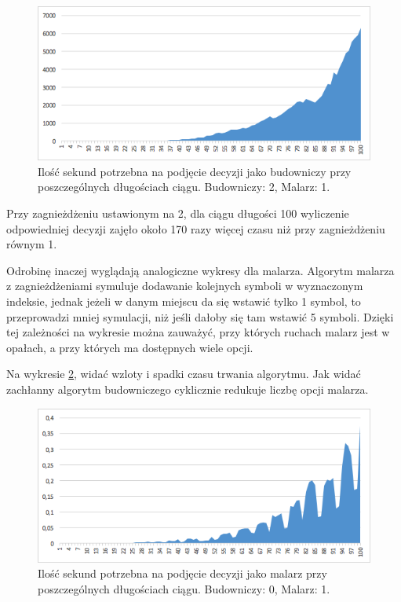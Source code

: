 \documentclass[document]{xmgr}
\begin{document}
\begin{figure}[H]
    \centering
    \includegraphics[scale = 0.7]{images/timeBuilder2Painter1}
    \caption{Ilość sekund potrzebna na podjęcie decyzji jako budowniczy przy poszczególnych długościach ciągu. Budowniczy: 2, Malarz: 1.}
    \label{fig:builder2painter1}
\end{figure}

Przy zagnieżdżeniu ustawionym na 2, dla ciągu długości 100 wyliczenie odpowiedniej decyzji zajęło około 170 razy więcej czasu niż przy zagnieżdżeniu równym 1.

Odrobinę inaczej wyglądają analogiczne wykresy dla malarza. Algorytm malarza z zagnieżdżeniami symuluje dodawanie kolejnych symboli w wyznaczonym indeksie, jednak jeżeli w danym miejscu da się wstawić tylko 1 symbol, to przeprowadzi mniej symulacji, niż jeśli dałoby się tam wstawić 5 symboli. Dzięki tej zależności na wykresie można zauważyć, przy których ruchach malarz jest w opałach, a przy których ma dostępnych wiele opcji.

Na wykresie \ref{fig:painter1builder0}, widać wzloty i spadki czasu trwania algorytmu. Jak widać zachłanny algorytm budowniczego cyklicznie redukuje liczbę opcji malarza.

\begin{figure}[h]
    \centering
    \includegraphics[scale = 0.7]{images/timePainter1Builder0}
    \caption{Ilość sekund potrzebna na podjęcie decyzji jako malarz przy poszczególnych długościach ciągu. Budowniczy: 0, Malarz: 1.}
    \label{fig:painter1builder0}
\end{figure}
\end{document}
